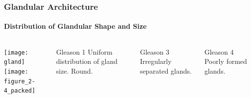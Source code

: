 \begin{frame}
\frametitle{Glandular Architecture}
    \framesubtitle{Distribution of Glandular Shape and Size}

    \begin{columns}
        \centering
        \texttt{[image: gland]}\\
        \texttt{[image: figure\_2-4\_packed]}
        \begin{block}{Gleason 1}
            Uniform distribution of gland size. Round.
        \end{block}
        \begin{block}{Gleason 3}
            Irregularly separated glands.
        \end{block}
        \begin{block}{Gleason 4}
            Poorly formed glands.
        \end{block}
    \end{columns}
\end{frame}


